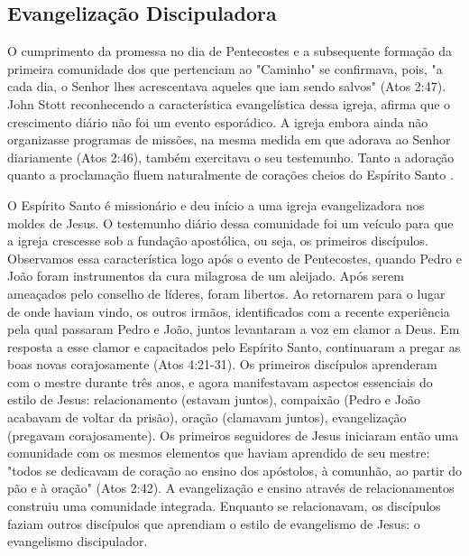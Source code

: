 \documentclass[12pt,openright,oneside,a4paper]{abntex2}
\begin{document}
\subsection{Evangelização Discipuladora}

O cumprimento da promessa no dia de Pentecostes e a subsequente formação da primeira comunidade dos que pertenciam ao "Caminho" se confirmava, pois, "a cada dia, o Senhor lhes acrescentava aqueles que iam sendo salvos" (Atos 2:47). John Stott reconhecendo a característica evangelística dessa igreja, afirma que o crescimento diário não foi um evento esporádico. A igreja embora ainda não organizasse programas de missões, na mesma medida em que adorava ao Senhor diariamente (Atos 2:46), também exercitava o seu testemunho. Tanto a adoração quanto a proclamação fluem naturalmente de corações cheios do Espírito Santo \cite[p. 118,119]{stott}. 

O Espírito Santo é missionário e deu início a uma igreja evangelizadora nos moldes de Jesus. O testemunho diário dessa comunidade foi um veículo para que a igreja crescesse \cite[p. 78]{stott} sob a fundação apostólica, ou seja, os primeiros discípulos. Observamos essa característica logo após o evento de Pentecostes, quando Pedro e João foram instrumentos da  cura milagrosa de um aleijado. Após serem ameaçados pelo conselho de líderes, foram libertos. Ao retornarem para o lugar de onde haviam vindo, os outros irmãos, identificados com a recente experiência pela qual passaram Pedro e João, juntos levantaram a voz em clamor a Deus. Em resposta a esse clamor e capacitados pelo Espírito Santo, continuaram a pregar as boas novas corajosamente (Atos 4:21-31). Os primeiros discípulos aprenderam com o mestre durante três anos, e agora manifestavam aspectos essenciais do estilo de Jesus: relacionamento (estavam juntos), compaixão (Pedro e João acabavam de voltar da prisão), oração (clamavam juntos), evangelização (pregavam corajosamente). Os primeiros seguidores de Jesus iniciaram então uma comunidade com os mesmos elementos que haviam aprendido de seu mestre: "todos se dedicavam de coração ao ensino dos apóstolos, à comunhão, ao partir do pão e à oração" (Atos 2:42). A evangelização e ensino através de relacionamentos construiu uma comunidade integrada. Enquanto se relacionavam, os discípulos faziam outros discípulos que aprendiam o estilo de evangelismo de Jesus: o evangelismo discipulador.

\end{document}
